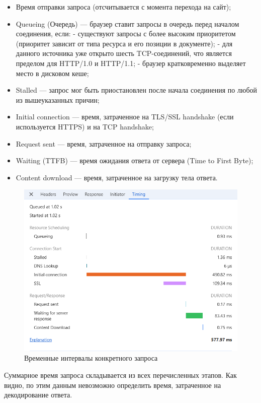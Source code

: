 \documentclass[12pt]{article}
\begin{document}
\begin{itemize}[label=-]
    \item Время отправки запроса (отсчитывается с момента перехода на сайт);
    \item Queueing (Очередь) — браузер ставит запросы в очередь перед началом соединения, если:
          - существуют запросы с более высоким приоритетом (приоритет зависит от типа ресурса и его позиции в документе);
          - для данного источника уже открыто шесть TCP-соединений, что является пределом для HTTP/1.0 и HTTP/1.1;
          - браузер кратковременно выделяет место в дисковом кеше;
    \item Stalled — запрос мог быть приостановлен после начала соединения по любой из вышеуказанных причин;
    \item Initial connection — время, затраченное на TLS/SSL handshake (если используется HTTPS) и на TCP handshake;
    \item Request sent — время, затраченное на отправку запроса;
    \item Waiting (TTFB) — время ожидания ответа от сервера (Time to First Byte);
    \item Content download — время, затраченное на загрузку тела ответа.
\end{itemize}

\begin{figure}[H]
    \centering
    \includegraphics[width=1\textwidth]{../images/network__timing.png}
    \caption{Временные интервалы конкретного запроса}
\end{figure}

Суммарное время запроса складывается из всех перечисленных этапов.
Как видно, по этим данным невозможно определить время,
затраченное на декодирование ответа.
\end{document}
